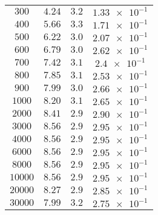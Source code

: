 \begin{figure}
\begin{tabular}{S S S S}
     {$\num{300}$} & {$\num{4.24}$}  & {$\num{3.2}$} & {$\num{1.33e-1}$}  \\
     {$\num{400}$} & {$\num{5.66}$}  & {$\num{3.3}$} & {$\num{1.71e-1}$}  \\
     {$\num{500}$} & {$\num{6.22}$}  & {$\num{3.0}$} & {$\num{2.07e-1}$}  \\
     {$\num{600}$} & {$\num{6.79}$}  & {$\num{3.0}$} & {$\num{2.62e-1}$}  \\
     {$\num{700}$} & {$\num{7.42}$}  & {$\num{3.1}$} & {$\num{2.4e-1}$}  \\
     {$\num{800}$} & {$\num{7.85}$}  & {$\num{3.1}$} & {$\num{2.53e-1}$}  \\
     {$\num{900}$} & {$\num{7.99}$}  & {$\num{3.0}$} & {$\num{2.66e-1}$}  \\
     {$\num{1000}$} & {$\num{8.20}$}  & {$\num{3.1}$} & {$\num{2.65e-1}$}  \\
     {$\num{2000}$} & {$\num{8.41}$}  & {$\num{2.9}$} & {$\num{2.90e-1}$}  \\
     {$\num{3000}$} & {$\num{8.56}$}  & {$\num{2.9}$} & {$\num{2.95e-1}$}  \\
     {$\num{4000}$} & {$\num{8.56}$}  & {$\num{2.9}$} & {$\num{2.95e-1}$}  \\
     {$\num{6000}$} & {$\num{8.56}$}  & {$\num{2.9}$} & {$\num{2.95e-1}$}  \\
     {$\num{8000}$} & {$\num{8.56}$}  & {$\num{2.9}$} & {$\num{2.95e-1}$}  \\
     {$\num{10000}$} & {$\num{8.56}$}  & {$\num{2.9}$} & {$\num{2.95e-1}$}  \\
     {$\num{20000}$} & {$\num{8.27}$}  & {$\num{2.9}$} & {$\num{2.85e-1}$}  \\
     {$\num{30000}$} & {$\num{7.99}$}  & {$\num{3.2}$} & {$\num{2.75e-1}$}  \\
    \bottomrule
  \end{tabular}
 \end{figure}